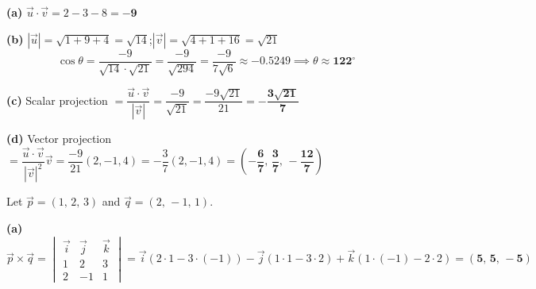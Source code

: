 \documentclass[addpoints]{exam}
\begin{document}
\begin{questions}
\begin{solution}[9cm]
\textbf{(a)} $\vec{u}\cdot\vec{v} = 2 - 3 - 8 = \mathbf{-9}$

\textbf{(b)} $|\vec{u}| = \sqrt{1+9+4} = \sqrt{14}$;\quad $|\vec{v}| = \sqrt{4+1+16} = \sqrt{21}$
\[
\cos\theta = \frac{-9}{\sqrt{14}\cdot\sqrt{21}} = \frac{-9}{\sqrt{294}} = \frac{-9}{7\sqrt{6}}
\approx -0.5249 \implies \theta \approx \mathbf{122^\circ}
\]

\textbf{(c)} Scalar projection $= \dfrac{\vec{u}\cdot\vec{v}}{|\vec{v}|} = \dfrac{-9}{\sqrt{21}}
= \dfrac{-9\sqrt{21}}{21} = \mathbf{-\dfrac{3\sqrt{21}}{7}}$

\textbf{(d)} Vector projection
$= \dfrac{\vec{u}\cdot\vec{v}}{|\vec{v}|^2}\vec{v} = \dfrac{-9}{21}(2,-1,4)
= -\dfrac{3}{7}(2,-1,4) = \mathbf{\left(-\dfrac{6}{7},\,\dfrac{3}{7},\,-\dfrac{12}{7}\right)}$
\end{solution}

\question Let $\vec{p} = (1,\,2,\,3)$ and $\vec{q} = (2,\,-1,\,1)$.
\begin{solution}[9cm]
\textbf{(a)}
\[
\vec{p} \times \vec{q} = \begin{vmatrix}
\vec{i} & \vec{j} & \vec{k} \\
1 & 2 & 3 \\
2 & -1 & 1
\end{vmatrix}
= \vec{i}(2\cdot1 - 3\cdot(-1)) - \vec{j}(1\cdot1 - 3\cdot2) + \vec{k}(1\cdot(-1) - 2\cdot2)
= \mathbf{(5,\,5,\,-5)}
\]


\end{solution}
\end{questions}
\end{document}
